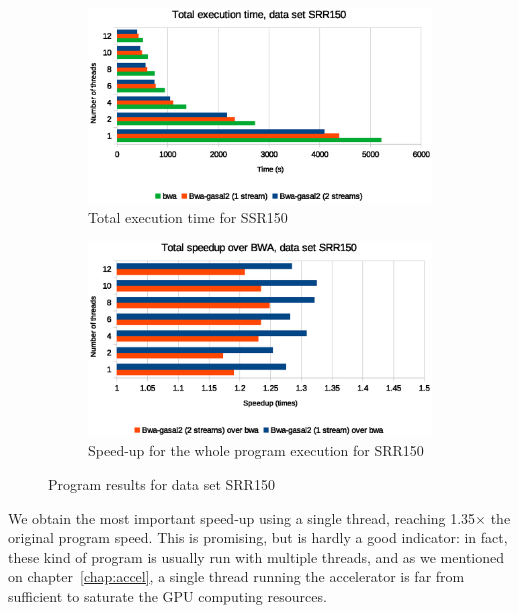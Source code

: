 \begin{figure}[p]
	\centering
	\begin{subfigure}[t]{1\textwidth}
		\centering
			\includegraphics[width=1\textwidth]{srr150/total-exec-time-srr150}
		\caption{Total execution time for SSR150}
		\label{fig:total-exec-time-srr150}
	\end{subfigure}%
	
	\begin{subfigure}[b]{1\textwidth}
		\centering
		\includegraphics[width=1\textwidth]{srr150/total-exec-speed-up-srr150}
		\caption{Speed-up for the whole program execution for SRR150}
		\label{fig:total-exec-speed-up-srr150}
	\end{subfigure}
	\caption{Program results for data set SRR150}
\end{figure}


We obtain the most important speed-up using a single thread, reaching 1.35$\times$ the original program speed. This is promising, but is hardly a good indicator: in fact, these kind of program is usually run with multiple threads, and as we mentioned on chapter~\ref{chap:accel}, a single thread running the accelerator is far from sufficient to saturate the GPU computing resources.

